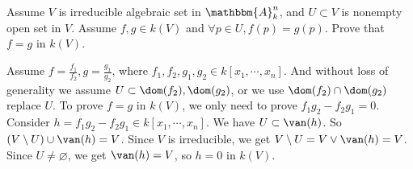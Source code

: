 \documentclass{ctexart}
\begin{document}
\begin{problem}
  Assume \(V\) is irreducible algebraic set in \(\mathbbm{A}_k^{n}\), and \(U \subset V\) is nonempty open set in \(V\). 
  Assume \(f,g \in k(V)\) and \(\forall p \in U,f(p)=g(p)\). Prove that \(f=g\) in \(k(V)\). 
\end{problem}

\begin{solution}
  Assume \(f=\frac{f_1}{f_2},g=\frac{g_1}{g_2}\), where \(f_1,f_2,g_1,g_2 \in k[x_1,\cdots,x_n]\).
  And without loss of generality we assume \(U \subset \dom(f_2),\dom(g_2)\), or we use \(\dom(f_2) \cap \dom(g_2)\) replace \(U\). 
  To prove \(f=g\) in \(k(V)\), we only need to prove \(f_1g_2-f_2g_1=0\). 
  Consider \(h=f_1 g_2 - f_2 g_1 \in k[x_1,\cdots,x_n]\). We have \(U \subset \van(h)\). 
  So \((V\setminus U) \cup \van(h)=V\). Since \(V\) is irreducible, we get \(V\setminus U=V \vee \van(h)=V\). 
  Since \(U \neq \varnothing\), we get \(\van(h)=V\), so \(h=0\) in \(k(V)\).
\end{solution}
\end{document}

